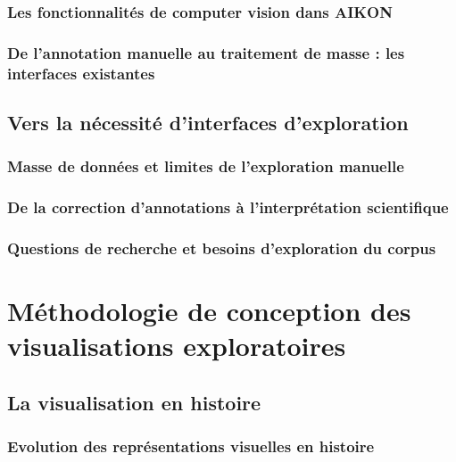 \documentclass[a4paper,12pt,twoside]{book}
\newcommand{\clearemptydoublepage}{\newpage{\pagestyle{empty}\cleardoublepage}}
\begin{document}
	 
	


	
	\section{Les fonctionnalités de computer vision dans AIKON}
	
	
	\section[Les interfaces existantes]{De l'annotation manuelle au traitement de masse : les interfaces existantes}
	
	
	\clearemptydoublepage
	
	\chapter{Vers la nécessité d'interfaces d'exploration}
	\section{Masse de données et limites de l'exploration manuelle}
	
	
	\section{De la correction d'annotations à l'interprétation scientifique}
	
	
	\section{Questions de recherche et besoins d'exploration du corpus}
	
	
	\clearemptydoublepage
	
	
	\part{Méthodologie de conception des visualisations exploratoires}
	\chapter{La visualisation en histoire}
	\section{Evolution des représentations visuelles en histoire}
	
	
\end{document}
